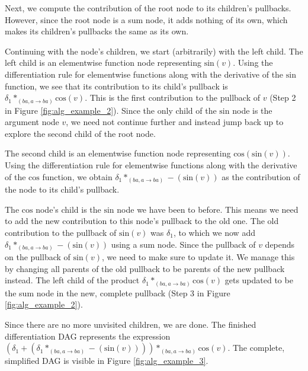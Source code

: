 \documentclass[12pt, a4paper]{report} %
\begin{document}
Next, we compute the contribution of the root node to its children's pullbacks.
However, since the root node is a sum node, it adds nothing of its own, which makes its children's pullbacks the same as its own.

Continuing with the node's children, we start (arbitrarily) with the left child.
The left child is an elementwise function node representing $\text{sin}(v)$.
Using the differentiation rule for elementwise functions along with the derivative of the $\text{sin}$ function, we see that its contribution to its child's pullback is $\delta_1 *_{(ba,a \rightarrow ba)} \text{cos}(v)$.
This is the first contribution to the pullback of $v$ (Step 2 in Figure \ref{fig:alg_example_2}).
Since the only child of the $\text{sin}$ node is the argument node $v$, we need not continue further and instead jump back up to explore the second child of the root node.

The second child is an elementwise function node representing $\text{cos}(\text{sin}(v))$.
Using the differentiation rule for elementwise functions along with the derivative of the $\text{cos}$ function, we obtain $\delta_1 *_{(ba,a \rightarrow ba)} -(\text{sin}(v))$ as the contribution of the node to its child's pullback.

The $\text{cos}$ node's child is the $\text{sin}$ node we have been to before.
This means we need to add the new contribution to this node's pullback to the old one.
The old contribution to the pullback of $\text{sin}(v)$ was $\delta_1$, to which we now add $\delta_1 *_{(ba,a \rightarrow ba)} -(\text{sin}(v))$ using a sum node.
Since the pullback of $v$ depends on the pullback of $\text{sin}(v)$, we need to make sure to update it.
We manage this by changing all parents of the old pullback to be parents of the new pullback instead.
The left child of the product $\delta_1 *_{(ba,a \rightarrow ba)} \text{cos}(v)$ gets updated to be the sum node in the new, complete pullback (Step 3 in Figure \ref{fig:alg_example_2}).

Since there are no more unvisited children, we are done.
The finished differentiation DAG represents the expression $(\delta_1 + (\delta_1 *_{(ba,a \rightarrow ba)} -(\text{sin}(v)))) *_{(ba,a \rightarrow ba)} \text{cos}(v)$.
The complete, simplified DAG is visible in Figure \ref{fig:alg_example_3}.
\end{document}

